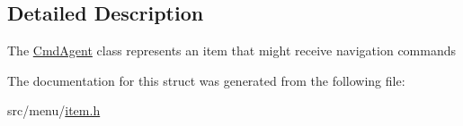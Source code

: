 \subsection{Detailed Description}
The \hyperlink{structCmdAgent}{Cmd\+Agent} class represents an item that might receive navigation commands 

The documentation for this struct was generated from the following file\+:\begin{DoxyCompactItemize}
\item 
src/menu/\hyperlink{item_8h}{item.\+h}\end{DoxyCompactItemize}
